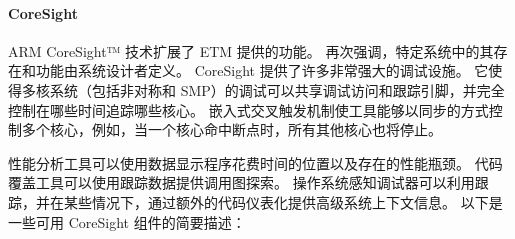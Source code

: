 \paragraph*{CoreSight} \label{sec:CoreSight}

ARM CoreSight™ 技术扩展了 ETM 提供的功能。
再次强调，特定系统中的其存在和功能由系统设计者定义。
CoreSight 提供了许多非常强大的调试设施。
它使得多核系统（包括非对称和 SMP）的调试可以共享调试访问和跟踪引脚，并完全控制在哪些时间追踪哪些核心。
嵌入式交叉触发机制使工具能够以同步的方式控制多个核心，例如，当一个核心命中断点时，所有其他核心也将停止。

性能分析工具可以使用数据显示程序花费时间的位置以及存在的性能瓶颈。
代码覆盖工具可以使用跟踪数据提供调用图探索。
操作系统感知调试器可以利用跟踪，并在某些情况下，通过额外的代码仪表化提供高级系统上下文信息。
以下是一些可用 CoreSight 组件的简要描述：


